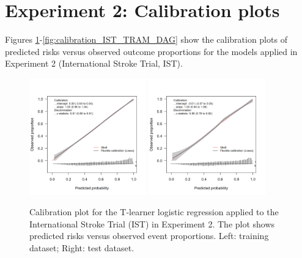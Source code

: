\section{Experiment 2: Calibration plots} \label{sec:calibrations_experiment2}

Figures \ref{fig:calibration_IST_glm}-\ref{fig:calibration_IST_TRAM_DAG} show the calibration plots of predicted risks versus observed outcome proportions for the models applied in Experiment 2 (International Stroke Trial, IST).



\begin{figure}[htbp]
\centering
\includegraphics[width=0.45\textwidth]{img/results_IST/glm_tlearner_train_calibration_plot.png}
\includegraphics[width=0.45\textwidth]{img/results_IST/glm_tlearner_test_calibration_plot.png}
\caption{Calibration plot for the T-learner logistic regression applied to the International Stroke Trial (IST) in Experiment 2. The plot shows predicted risks versus observed event proportions. Left: training dataset; Right: test dataset.}
\label{fig:calibration_IST_glm}
\end{figure}


